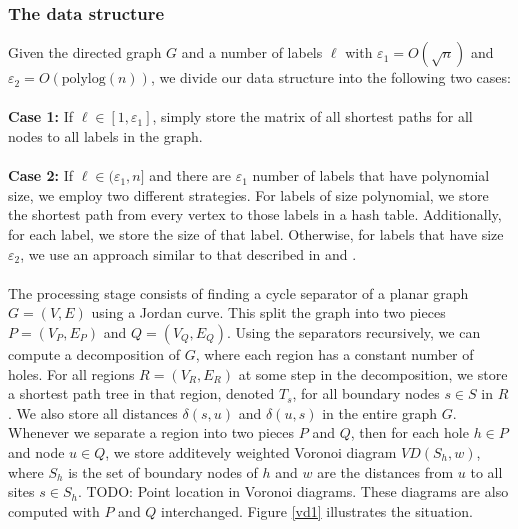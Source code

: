 \subsubsection{The data structure}
Given the directed graph $G$ and a number of labels $\ell$ with
$\varepsilon_1 = O(\sqrt{n})$ and $\varepsilon_2=O(\text{polylog}(n))$, we divide our
data structure into the following two cases: \\
\\
\textbf{Case 1:} If $\ell\in [1, \varepsilon_1]$, simply store the matrix of all shortest paths for all nodes to all
labels in the graph. \\
\\
\textbf{Case 2:} If $\ell\in (\varepsilon_1, n]$ and there are $\varepsilon_1$ number of labels that have
polynomial size, we employ two different strategies. For labels of size polynomial, we store the
shortest path from every vertex to those labels in a hash table. Additionally, for each
label, we store the size of that label. Otherwise, for labels that have size $\varepsilon_2$, we
use an approach similar to that described in \cite{cohen2017fast} and \cite{gawrychowski2017better}. \\
\\
The processing stage consists of finding a cycle separator of a planar graph
$G=(V,E)$ using a Jordan curve. This split the graph into two pieces $P=(V_P, E_P)$ and
$Q=(V_Q, E_Q)$. Using the separators recursively, we can compute a decomposition of $G$,
where each region has a constant number of holes. For all regions $R=(V_R, E_R)$ at some
step in the decomposition, we store a shortest path tree in that region, denoted $T_s$,
for all boundary nodes $s\in S$ in $R$. We also store all distances $\delta(s,u)$ and
$\delta(u,s)$ in the entire graph $G$. Whenever we separate a region into two pieces $P$
and $Q$, then for each hole $h\in P$ and node $u\in Q$, we store additevely weighted
Voronoi diagram $VD(S_h, w)$, where $S_h$ is the set of boundary nodes of $h$ and $w$ are
the distances from $u$ to all sites $s\in S_h$. TODO: Point location in Voronoi diagrams. These diagrams are also computed with $P$
and $Q$ interchanged. Figure \ref{vd1} illustrates the situation.


